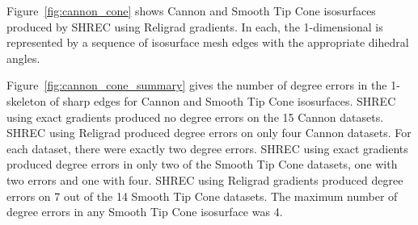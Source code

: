 Figure~\ref{fig:cannon_cone} shows Cannon and Smooth Tip Cone isosurfaces
produced by SHREC using Religrad gradients.
In each, the 1-dimensional is represented by a sequence 
of isosurface mesh edges with the appropriate dihedral angles.

Figure~\ref{fig:cannon_cone_summary} gives the number of degree errors
in the 1-skeleton of sharp edges
for Cannon and Smooth Tip Cone isosurfaces.
SHREC using exact gradients produced no degree errors 
on the 15 Cannon datasets.
SHREC using Religrad produced degree errors on only four Cannon datasets.
For each dataset, there were exactly two degree errors.
SHREC using exact gradients produced degree errors in only two 
of the Smooth Tip Cone datasets,
one with two errors and one with four.
SHREC using Religrad gradients produced degree errors on 7 out of the 14
Smooth Tip Cone datasets.
The maximum number of degree errors in any Smooth Tip Cone isosurface
was 4.



